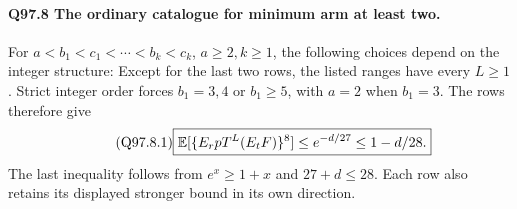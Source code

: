 \paragraph{Q97.8 The ordinary catalogue for minimum arm at least two.}
For \(a<\allowbreak b_1<\allowbreak c_1<\allowbreak \cdots<\allowbreak b_k<\allowbreak c_k\), \(a\ge\allowbreak 2,\allowbreak k\ge\allowbreak 1\), the following
choices depend on the integer structure:
Except for the last two rows, the listed ranges have every \(L\ge\allowbreak 1\).
Strict integer order forces \(b_1=\allowbreak 3,\allowbreak 4\) or \(b_1\ge\allowbreak 5\), with \(a=\allowbreak 2\)
when \(b_1=\allowbreak 3\). The rows therefore give
\begin{equation}\tag{Q97.8.1}\label{eq:Q97:8.1}
\boxed{\mathbb E[\{E_rpT^L(E_tF)\}^8]\le e^{-d/27}\le1-d/28.}
\end{equation}
The last inequality follows from \(e^x\ge\allowbreak 1+x\) and \(27+d\le\allowbreak 28\).
Each row also retains its displayed stronger bound in its own direction.
